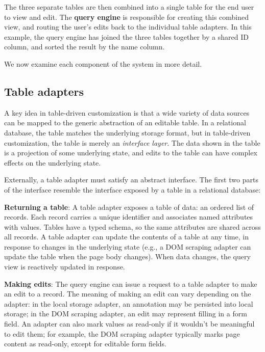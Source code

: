 \documentclass[sigplan,screen,10pt,anonymous,review]{acmart}
\begin{document}
The three separate tables are then combined into a single table for the
end user to view and edit. The \textbf{query engine} is responsible for
creating this combined view, and routing the user's edits back to the
individual table adapters. In this example, the query engine has joined
the three tables together by a shared ID column, and sorted the result
by the name column.

We now examine each component of the system in more detail.

\hypertarget{table-adapters}{%
\subsection{Table adapters}\label{table-adapters}}

A key idea in table-driven customization is that a wide variety of data
sources can be mapped to the generic abstraction of an editable table.
In a relational database, the table matches the underlying storage
format, but in table-driven customization, the table is merely an
\emph{interface layer}. The data shown in the table is a projection of
some underlying state, and edits to the table can have complex effects
on the underlying state.

Externally, a table adapter must satisfy an abstract interface. The
first two parts of the interface resemble the interface exposed by a
table in a relational database:

\textbf{Returning a table}: A table adapter exposes a table of data: an
ordered list of records. Each record carries a unique identifier and
associates named attributes with values. Tables have a typed schema, so
the same attributes are shared across all records. A table adapter can
update the contents of a table at any time, in response to changes in
the underlying state (e.g., a DOM scraping adapter can update the table
when the page body changes). When data changes, the query view is
reactively updated in response.

\textbf{Making edits}: The query engine can issue a request to a table
adapter to make an edit to a record. The meaning of making an edit can
vary depending on the adapter: in the local storage adapter, an
annotation may be persisted into local storage; in the DOM scraping
adapter, an edit may represent filling in a form field. An adapter can
also mark values as read-only if it wouldn't be meaningful to edit them;
for example, the DOM scraping adapter typically marks page content as
read-only, except for editable form fields.
\end{document}
